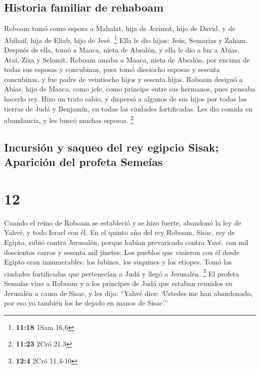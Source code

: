 \hypertarget{historia-familiar-de-rehaboam}{%
\subsection{Historia familiar de
rehaboam}\label{historia-familiar-de-rehaboam}}

 Roboam tomó como esposa a Mahalat, hija de Jerimot, hijo
de David, y de Abihail, hija de Eliab, hijo de Jesé. \footnote{\textbf{11:18}
  1Sam 16,6}  Ella le dio hijos: Jeús, Semarías y Zaham.
 Después de ella, tomó a Maaca, nieta de Absalón, y ella
le dio a luz a Abías, Atai, Ziza y Selomit.  Roboam amaba
a Maaca, nieta de Absalón, por encima de todas sus esposas y concubinas,
pues tomó dieciocho esposas y sesenta concubinas, y fue padre de
veintiocho hijos y sesenta hijas.  Roboam designó a
Abías, hijo de Maaca, como jefe, como príncipe entre sus hermanos, pues
pensaba hacerlo rey.  Hizo un trato sabio, y dispersó a
algunos de sus hijos por todas las tierras de Judá y Benjamín, en todas
las ciudades fortificadas. Les dio comida en abundancia, y les buscó
muchas esposas. \footnote{\textbf{11:23} 2Cró 21,3}

\hypertarget{incursiuxf3n-y-saqueo-del-rey-egipcio-sisak-apariciuxf3n-del-profeta-semeuxedas}{%
\subsection{Incursión y saqueo del rey egipcio Sisak; Aparición del
profeta
Semeías}\label{incursiuxf3n-y-saqueo-del-rey-egipcio-sisak-apariciuxf3n-del-profeta-semeuxedas}}

\hypertarget{section-11}{%
\section{12}\label{section-11}}

 Cuando el reino de Roboam se estableció y se hizo fuerte,
abandonó la ley de Yahvé, y todo Israel con él.  En el
quinto año del rey Roboam, Sisac, rey de Egipto, subió contra Jerusalén,
porque habían prevaricado contra Yavé,  con mil doscientos
carros y sesenta mil jinetes. Los pueblos que vinieron con él desde
Egipto eran innumerables: los lubines, los suquines y los etíopes.
 Tomó las ciudades fortificadas que pertenecían a Judá y
llegó a Jerusalén. \footnote{\textbf{12:4} 2Cró 11,4-10} 
El profeta Semaías vino a Roboam y a los príncipes de Judá que estaban
reunidos en Jerusalén a causa de Sisac, y les dijo: ``Yahvé dice:
`Ustedes me han abandonado, por eso yo también los he dejado en manos de
Sisac'.''

